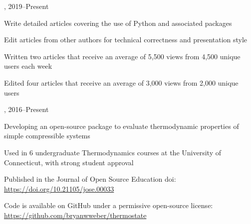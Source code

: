 \vspace{\baselineskip}

,  \hfill 2019--Present

\begin{innerlist}
    \item Write detailed articles covering the use of Python and associated packages
    \item Edit articles from other authors for technical correctness and presentation style
    \item Written two articles that receive an average of 5,500 views from 4,500 unique users each week
    \item Edited four articles that receive an average of 3,000 views from 2,000 unique users
\end{innerlist}

\vspace{\baselineskip}

,  \hfill 2016--Present

\begin{innerlist}
    \item Developing an open-source package to evaluate thermodynamic properties of simple compressible systems
    \item Used in 6 undergraduate Thermodynamics courses at the University of Connecticut, with strong student approval
    \item Published in the Journal of Open Source Education doi: \href{https://doi.org/10.21105/jose.00033}{https://doi.org/10.21105/jose.00033}
    \item Code is available on GitHub under a permissive open-source license: \url{https://github.com/bryanwweber/thermostate}
\end{innerlist}

\vspace{\baselineskip}



